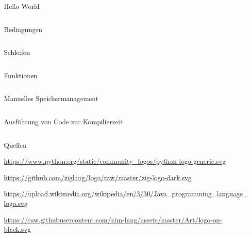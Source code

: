 \documentclass[aspectratio=169]{beamer}
\begin{document}
\begin{frame}{Hello World}
  \inputminted[linenos]{zig}{examples/hello.zig}
\end{frame}

\begin{frame}{Bedingungen}
  \inputminted[linenos]{zig}{examples/condition.zig}
\end{frame}

\begin{frame}{Schleifen}
  \inputminted[linenos]{zig}{examples/loops.zig}
\end{frame}

\begin{frame}{Funktionen}
  \inputminted[linenos]{zig}{examples/functions.zig}
\end{frame}

\begin{frame}{Manuelles Speichermanagement}
  \inputminted[linenos]{zig}{examples/memory_management.zig}
\end{frame}

\begin{frame}{Ausführung von Code zur Kompilierzeit}
  \inputminted[linenos]{zig}{examples/comptime.zig}
\end{frame}

\begin{frame}{Quellen}
  \begin{thebibliography}{}
    \url{https://www.python.org/static/community_logos/python-logo-generic.svg}

    \url{https://github.com/ziglang/logo/raw/master/zig-logo-dark.svg}

    \url{https://upload.wikimedia.org/wikipedia/en/3/30/Java_programming_language_logo.svg}

    \url{https://raw.githubusercontent.com/nim-lang/assets/master/Art/logo-on-black.svg}

  \end{thebibliography}
\end{frame}
\end{document}
